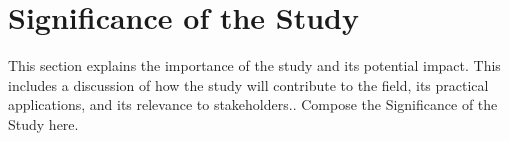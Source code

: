 \section{Significance of the Study}

	This section explains the importance of the study and its potential impact. This includes a discussion of how the study will contribute to the field, its practical applications, and its relevance to stakeholders.. Compose the Significance of the Study here.